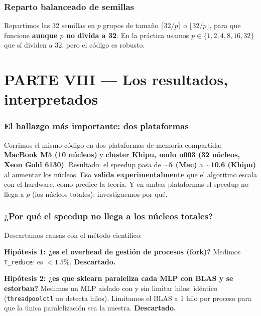 \documentclass[11pt,a4paper]{article}
\begin{document}
\section{Reparto balanceado de semillas}

Repartimos las 32 semillas en $p$ grupos de tamaño $\lceil 32/p\rceil$ o
$\lfloor 32/p\rfloor$, para que funcione \textbf{aunque $p$ no divida a 32}. En
la práctica usamos $p\in\{1,2,4,8,16,32\}$ que sí dividen a 32, pero el código es
robusto.

\part*{PARTE VIII --- Los resultados, interpretados}

\section{El hallazgo más importante: dos plataformas}

\begin{importante}[title=\textbf{Mismo algoritmo, dos hardwares: el speedup escala}]
Corrimos el mismo código en dos plataformas de memoria compartida:
\textbf{MacBook M5 (10 núcleos)} y \textbf{cluster Khipu, nodo n003 (32 núcleos,
Xeon Gold 6130)}. Resultado: el speedup pasa de \textbf{$\sim$5 (Mac)} a
\textbf{$\sim$10.6 (Khipu)} al aumentar los núcleos. Eso \textbf{valida
experimentalmente} que el algoritmo escala con el hardware, como predice la
teoría. Y en ambas plataformas el speedup no llega a $p$ (los núcleos totales):
investiguemos por qué.
\end{importante}

\section{¿Por qué el speedup no llega a los núcleos totales?}

Descartamos causas con el método científico:

\textbf{Hipótesis 1: ¿es el overhead de gestión de procesos (fork)?}
Medimos \texttt{T\_reduce}: es $<1.5\%$. \textbf{Descartado.}

\textbf{Hipótesis 2: ¿es que sklearn paraleliza cada MLP con BLAS y se estorban?}
Medimos un MLP aislado con y sin limitar hilos: idéntico
(\texttt{threadpoolctl} no detecta hilos). Limitamos el BLAS a 1 hilo por proceso
para que la única paralelización sea la nuestra. \textbf{Descartado.}
\end{document}
